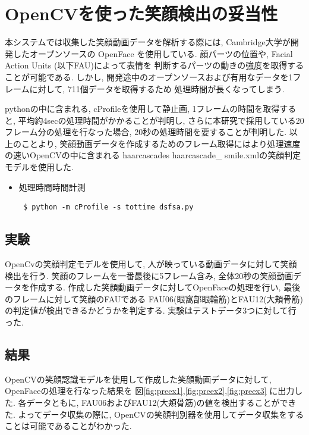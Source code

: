 \section{OpenCVを使った笑顔検出の妥当性}
本システムでは収集した笑顔動画データを解析する際には, Cambridge大学が開発したオープンソースの
OpenFace を使用している. 顔パーツの位置や, Facial Action Units (以下FAU)によって表情を
判断するパーツの動きの強度を取得することが可能である.
しかし, 開発途中のオープンソースおよび有用なデータを1フレームに対して, 711個データを取得するため
処理時間が長くなってしまう.

pythonの中に含まれる, cProfileを使用して静止画,
1フレームの時間を取得すると, 平均約4secの処理時間がかかることが判明し, さらに本研究で採用している20フレーム分の処理を行なった場合,
20秒の処理時間を要することが判明した.
以上のことより, 笑顔動画データを作成するためのフレーム取得にはより処理速度の速いOpenCVの中に含まれる
haarcascades\/ haarcascade\_ smile.xmlの笑顔判定モデルを使用した.

 \begin{itemize}
   \setlength{\parskip}{20pt}      %
 \item 処理時間時間計測
 \begin{lstlisting}
 $ python -m cProfile -s tottime dsfsa.py
 \end{lstlisting}
 \end{itemize}

\subsection{実験}
OpenCvの笑顔判定モデルを使用して, 人が映っている動画データに対して笑顔検出を行う.
笑顔のフレームを一番最後に5フレーム含み, 全体20秒の笑顔動画データを作成する.
作成した笑顔動画データに対してOpenFaceの処理を行い, 最後のフレームに対して笑顔のFAUである
FAU06(眼窩部眼輪筋)とFAU12(大頬骨筋)の判定値が検出できるかどうかを判定する.
実験はテストデータ3つに対して行った.

\subsection{結果}
OpenCVの笑顔認識モデルを使用して作成した笑顔動画データに対して, OpenFaceの処理を行なった結果を
図\ref{fig:preex1},\ref{fig:preex2},\ref{fig:preex3} に出力した.
各データともに, FAU06およびFAU12(大頬骨筋)の値を検出することができた.
よってデータ収集の際に, OpenCVの笑顔判別器を使用してデータ収集をすることは可能であることがわかった.


